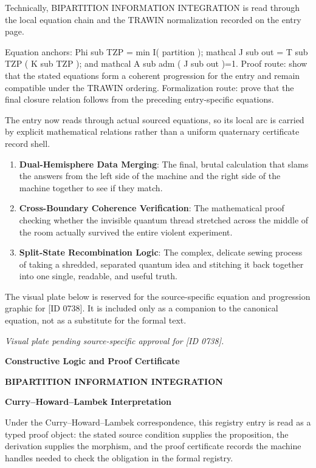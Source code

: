 Technically, BIPARTITION INFORMATION INTEGRATION is read through the local equation chain and the TRAWIN normalization recorded on the entry page.

Equation anchors: Phi sub TZP = min I( partition ); mathcal J sub out = T sub TZP ( K sub TZP ); and mathcal A sub adm ( J sub out )=1. Proof route: show that the stated equations form a coherent progression for the entry and remain compatible under the TRAWIN ordering. Formalization route: prove that the final closure relation follows from the preceding entry-specific equations.

The entry now reads through actual sourced equations, so its local arc is carried by explicit mathematical relations rather than a uniform quaternary certificate record shell.
\endgroup

\begin{enumerate}[leftmargin=1.6em,itemsep=6pt,topsep=4pt]
\item \textbf{Dual-Hemisphere Data Merging}: The final, brutal calculation that slams the answers from the left side of the machine and the right side of the machine together to see if they match.
\item \textbf{Cross-Boundary Coherence Verification}: The mathematical proof checking whether the invisible quantum thread stretched across the middle of the room actually survived the entire violent experiment.
\item \textbf{Split-State Recombination Logic}: The complex, delicate sewing process of taking a shredded, separated quantum idea and stitching it back together into one single, readable, and useful truth.
\end{enumerate}

\begingroup\footnotesize\sloppy
The visual plate below is reserved for the source-specific equation and progression graphic for [ID 0738]. It is included only as a companion to the canonical equation, not as a substitute for the formal text.
\par\endgroup
\begingroup\footnotesize\itshape
Visual plate pending source-specific approval for [ID 0738].
\par\endgroup

\clearpage
\begingroup\tzpsupportsetup
\noindent\textbf{\fontsize{10.8pt}{12.8pt}\selectfont [ID 0738] Constructive Logic and Proof Certificate}\par
\noindent\textbf{\fontsize{10pt}{12pt}\selectfont BIPARTITION INFORMATION INTEGRATION}\par
\vspace{0.45em}
\begingroup
\footnotesize
\setlength{\parskip}{0.22em}
\setlength{\parindent}{0pt}
\noindent\textbf{Curry--Howard--Lambek Interpretation}\par
Under the Curry--Howard--Lambek correspondence, this registry entry is read as a typed proof
object: the stated source condition supplies the proposition, the derivation supplies the
morphism, and the proof certificate records the machine handles needed to check the obligation
in the formal registry.

